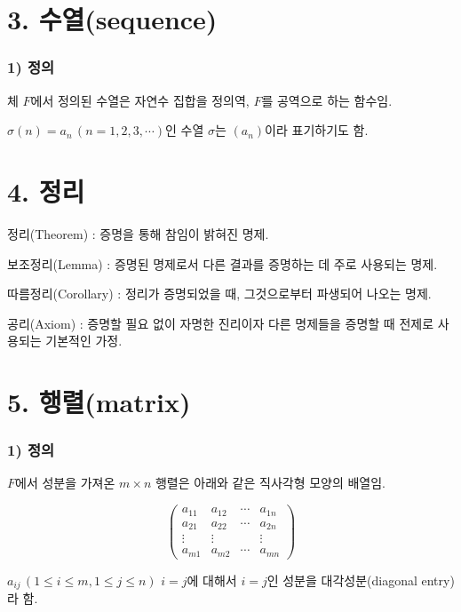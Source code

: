 \section*{3. 수열(sequence)}
\subsubsection*{1) 정의\\}
\begin{DEF}
체 $F$에서 정의된 수열은 자연수 집합을 정의역, $F$를 공역으로 하는 함수임.
\end{DEF}

$\sigma(n)=a_n\,(n=1,2,3, \cdots)$인 수열 $\sigma$는 $(a_n)$이라 표기하기도 함.

\section*{4. 정리}
정리(Theorem) : 증명을 통해 참임이 밝혀진 명제.

보조정리(Lemma) : 증명된 명제로서 다른 결과를 증명하는 데 주로 사용되는 명제.

따름정리(Corollary) : 정리가 증명되었을 때, 그것으로부터 파생되어 나오는 명제.

공리(Axiom) : 증명할 필요 없이 자명한 진리이자 다른 명제들을 증명할 때 전제로 사용되는 기본적인 가정.


\newpage


\section*{5. 행렬(matrix)}
\subsubsection*{1) 정의\\}
\begin{DEF}
$F$에서 성분을 가져온 $m \times n$ 행렬은 아래와 같은 직사각형 모양의 배열임.

\[
\begin{pmatrix}
a_{11} & a_{12} & \cdots & a_{1n}\\
a_{21} & a_{22} & \cdots & a_{2n}\\
\vdots & \vdots & & \vdots\\
a_{m1} & a_{m2} & \cdots & a_{mn}
\end{pmatrix}
\]
\end{DEF}

$a_{ij}\,(1 \leq i \leq m,1 \leq j \leq n)$ $i=j$에 대해서 $i=j$인 성분을 대각성분(diagonal entry)라 함.

